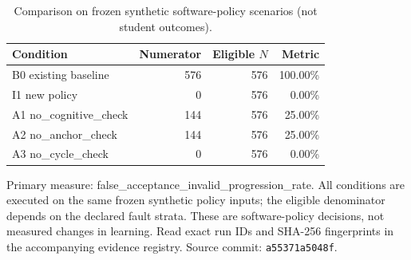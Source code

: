 \begin{table}[htbp]
\centering
\small
\caption{Comparison on frozen synthetic software-policy scenarios (not student outcomes).}
\label{tab:ln-01-policy-benchmark}
\begin{tabular}{lrrr}
\toprule
Condition & Numerator & Eligible $N$ & Metric \\
\midrule
B0 existing baseline & 576 & 576 & 100.00\% \\
I1 new policy & 0 & 576 & 0.00\% \\
A1 no\_cognitive\_check & 144 & 576 & 25.00\% \\
A2 no\_anchor\_check & 144 & 576 & 25.00\% \\
A3 no\_cycle\_check & 0 & 576 & 0.00\% \\
\bottomrule
\end{tabular}
\par\smallskip
\begin{minipage}{0.98\linewidth}\footnotesize
Primary measure: false\_acceptance\_invalid\_progression\_rate. All conditions are executed on the same frozen synthetic policy inputs; the eligible denominator depends on the declared fault strata. These are software-policy decisions, not measured changes in learning. Read exact run IDs and SHA-256 fingerprints in the accompanying evidence registry. Source commit: \texttt{a55371a5048f}.
\end{minipage}
\end{table}
